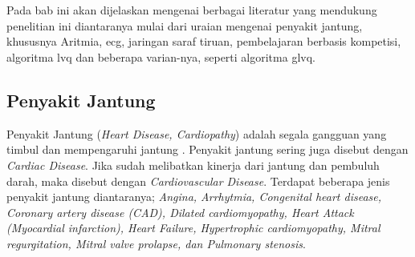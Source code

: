 \chapter{\babDua}
Pada bab ini akan dijelaskan mengenai berbagai literatur yang mendukung
penelitian ini diantaranya mulai dari uraian mengenai penyakit jantung,
khususnya Aritmia, \gls{ecg}, jaringan saraf tiruan, pembelajaran
berbasis kompetisi, algoritma \gls{lvq} dan beberapa varian-nya, seperti
algoritma \gls{glvq}.

\section{Penyakit Jantung}
\label{sec:jantung}
Penyakit Jantung (\textit{Heart Disease, Cardiopathy}) adalah segala gangguan
yang timbul dan mempengaruhi jantung \cite{medicinenet.1}. Penyakit jantung
sering juga disebut dengan \textit{Cardiac Disease}. Jika sudah melibatkan
kinerja dari jantung dan pembuluh darah, maka disebut dengan
\textit{Cardiovascular Disease}. Terdapat beberapa jenis penyakit jantung
diantaranya; \emph{Angina, Arrhytmia, Congenital heart disease, Coronary artery
disease (CAD), Dilated cardiomyopathy, Heart Attack (Myocardial infarction),
Heart Failure, Hypertrophic cardiomyopathy, Mitral regurgitation, Mitral valve
prolapse, dan Pulmonary stenosis}. 

